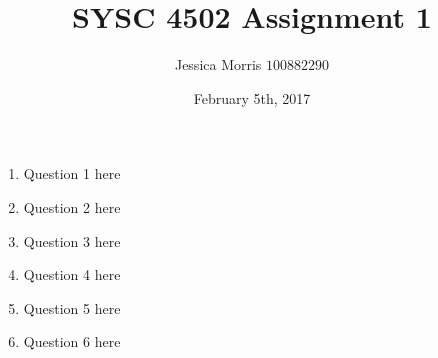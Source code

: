 \documentclass{article}
\title{SYSC 4502 Assignment 1}
\date{February 5th, 2017}
\author{Jessica Morris \(100882290\)}
\begin{document}
\maketitle

\begin{enumerate}

\item Question 1 here

\item Question 2 here

\item Question 3 here

\item Question 4 here

\item Question 5 here

\item Question 6 here

\end{enumerate}
\end{document}
